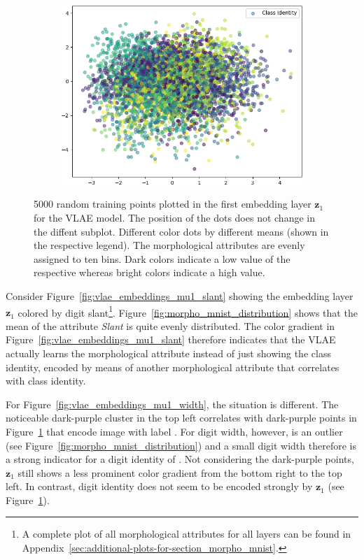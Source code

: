 \begin{figure}
\begin{subfigure}{.33\textwidth}
        \centering
        \includegraphics[width=\textwidth]{images/vlae_embeddings/embeddings_mu_1_6.png}
        \caption{}
        \label{fig:vlae_embeddings_mu1_identity}
    \end{subfigure}
    \caption{5000 random training points plotted in the first embedding layer $\bm{z}_1$ for the VLAE model. The position of the dots does not change in the diffent subplot. Different color dots by different means (shown in the respective legend). The morphological attributes are evenly assigned to ten bins. Dark colors indicate a low value of the respective whereas bright colors indicate a high value.}
    \label{fig:vlae_embeddings_mu1}
\end{figure}

Consider Figure~\ref{fig:vlae_embeddings_mu1_slant} showing the embedding layer $\bm{z}_1$ colored by digit slant\footnote{A complete plot of all morphological attributes for all layers can be found in Appendix~\ref{sec:additional-plots-for-section_morpho_mnist}.}.
Figure~\ref{fig:morpho_mnist_distribution} shows that the mean of the attribute \textit{Slant} is quite evenly distributed.
The color gradient in Figure~\ref{fig:vlae_embeddings_mu1_slant} therefore indicates that the VLAE actually learns the morphological attribute instead of just showing the class identity, encoded by means of another morphological attribute that correlates with class identity.

For Figure~\ref{fig:vlae_embeddings_mu1_width}, the situation is different.
The noticeable dark-purple cluster in the top left correlates with dark-purple points in Figure~\ref{fig:vlae_embeddings_mu1_identity} that encode image with label .
For digit width, however,  is an outlier (see Figure~\ref{fig:morpho_mnist_distribution}) and a small digit width therefore is a strong indicator for a digit identity of .
Not considering the dark-purple points, $\bm{z}_1$ still shows a less prominent color gradient from the bottom right to the top left.
In contrast, digit identity does not seem to be encoded strongly by $\bm{z}_1$ (see Figure~\ref{fig:vlae_embeddings_mu1_identity}).

